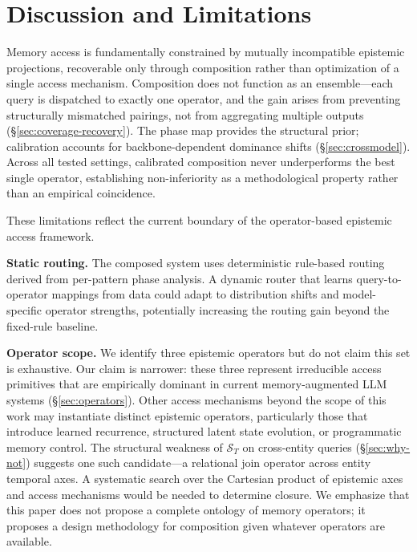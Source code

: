 \documentclass[letterpaper,twocolumn,10pt]{article}
\begin{document}
\section{Discussion and Limitations}
\label{sec:limitations}

Memory access is fundamentally constrained by mutually incompatible epistemic projections, recoverable only through composition rather than optimization of a single access mechanism. Composition does not function as an ensemble---each query is dispatched to exactly one operator, and the gain arises from preventing structurally mismatched pairings, not from aggregating multiple outputs (\S\ref{sec:coverage-recovery}). The phase map provides the structural prior; calibration accounts for backbone-dependent dominance shifts (\S\ref{sec:crossmodel}). Across all tested settings, calibrated composition never underperforms the best single operator, establishing non-inferiority as a methodological property rather than an empirical coincidence.

These limitations reflect the current boundary of the operator-based epistemic access framework.

\textbf{Static routing.} The composed system uses deterministic rule-based routing derived from per-pattern phase analysis. A dynamic router that learns query-to-operator mappings from data could adapt to distribution shifts and model-specific operator strengths, potentially increasing the routing gain beyond the fixed-rule baseline.

\textbf{Operator scope.} We identify three epistemic operators but do not claim this set is exhaustive. Our claim is narrower: these three represent irreducible access primitives that are empirically dominant in current memory-augmented LLM systems (\S\ref{sec:operators}). Other access mechanisms beyond the scope of this work may instantiate distinct epistemic operators, particularly those that introduce learned recurrence, structured latent state evolution, or programmatic memory control. The structural weakness of $\mathcal{S}_T$ on cross-entity queries (\S\ref{sec:why-not}) suggests one such candidate---a relational join operator across entity temporal axes. A systematic search over the Cartesian product of epistemic axes and access mechanisms would be needed to determine closure. We emphasize that this paper does not propose a complete ontology of memory operators; it proposes a design methodology for composition given whatever operators are available.
\end{document}
